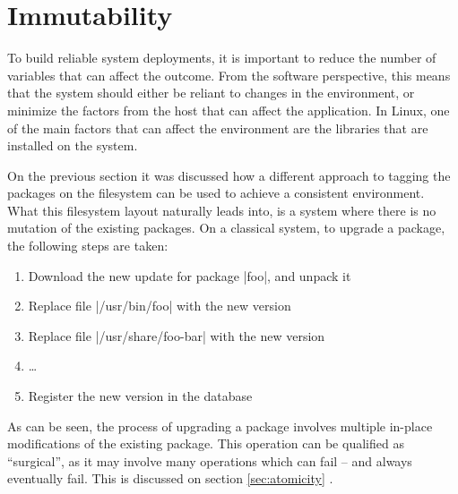 \FloatBarrier
\section{Immutability}

To build reliable system deployments, it is important to reduce the
number of variables that can affect the outcome. From the
software perspective, this means that the system should
either be reliant to changes in the environment, or minimize
the factors from the host that can affect the application.
In Linux, one of the main factors that can affect the
environment are the libraries that are installed on the
system.

On the previous section it was discussed how a different
approach to tagging the packages on the filesystem can be
used to achieve a consistent environment. What this
filesystem layout naturally leads into, is a system where
there is no mutation of the existing packages. On a
classical system, to upgrade a package, the following steps
are taken:

\begin{enumerate}
    \item Download the new update for package |foo|, and unpack it
    \item Replace file |/usr/bin/foo| with the new version
    \item Replace file |/usr/share/foo-bar| with the new version
    \item \ldots
    \item Register the new version in the database
\end{enumerate}

As can be seen, the process of upgrading a package involves
multiple in-place modifications of the existing package.
This operation can be qualified as ``surgical'', as it may
involve many operations which can fail -- and always
eventually fail. This is discussed on section
\ref{sec:atomicity} .

